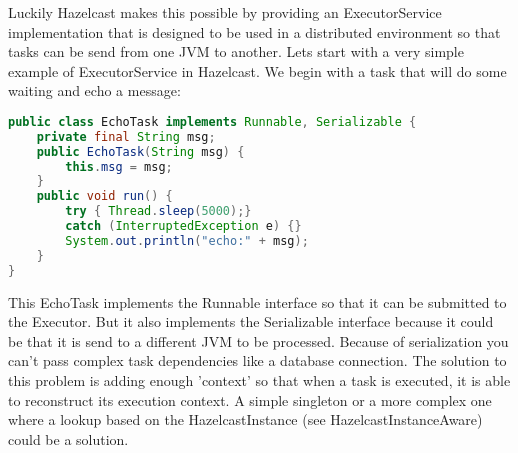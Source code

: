 Luckily Hazelcast makes this possible by providing an ExecutorService implementation that is designed to be used in a distributed environment so that tasks can be send from one JVM to another. Lets start with a very simple example of ExecutorService in Hazelcast. We begin with a task that will do some waiting and echo a message:
\begin{lstlisting}[language=java]
public class EchoTask implements Runnable, Serializable {
    private final String msg;
    public EchoTask(String msg) {
        this.msg = msg;
    }
    public void run() {
        try { Thread.sleep(5000);} 
        catch (InterruptedException e) {}
        System.out.println("echo:" + msg);
    }
}
\end{lstlisting}
This EchoTask implements the Runnable interface so that it can be submitted to the Executor. But it also implements the Serializable interface because it could be that it is send to a different JVM to be processed. Because of serialization you can't pass complex task dependencies like a database connection. The solution to this problem is adding enough 'context' so that when a task is executed, it is able to reconstruct its execution context. A simple singleton or a more complex one where a lookup based on the HazelcastInstance (see HazelcastInstanceAware) could be a solution.

